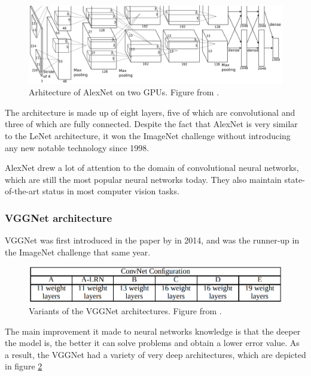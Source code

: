 \documentclass{report}[12pt, a4paper]
\begin{document}
\begin{figure}[htp]
    \centering
    \includegraphics[width=13cm]{alexnet_diagram}
    \caption{Arhitecture of AlexNet on two GPUs. Figure from \cite{alexnet_paper}.}
    \label{fig:alexnet_diagram}
\end{figure}

The architecture is made up of eight layers, five of which are convolutional and three of which are fully connected. Despite the fact that AlexNet is very similar to the LeNet architecture, it won the ImageNet challenge without introducing any new notable technology since 1998.

AlexNet drew a lot of attention to the domain of convolutional neural networks, which are still the most popular neural networks today. They also maintain state-of-the-art status in most computer vision tasks.

\subsubsection{VGGNet architecture}

VGGNet was first introduced in the paper  \cite{vggnet_paper} by \citeauthor{vggnet_paper} in 2014, and was the runner-up in the ImageNet challenge that same year.

\begin{figure}[htp]
    \centering
    \includegraphics[width=12cm]{vggnet_layer_configs}
    \caption{Variants of the VGGNet architectures. Figure from \cite{vggnet_paper}.}
    \label{fig:vggnet_layer_configs}
\end{figure}

The main improvement it made to neural networks knowledge is that the deeper the model is, the better it can solve problems and obtain a lower error value. As a result, the VGGNet had a variety of very deep architectures, which are depicted in figure \ref{fig:vggnet_layer_configs}
\end{document}
